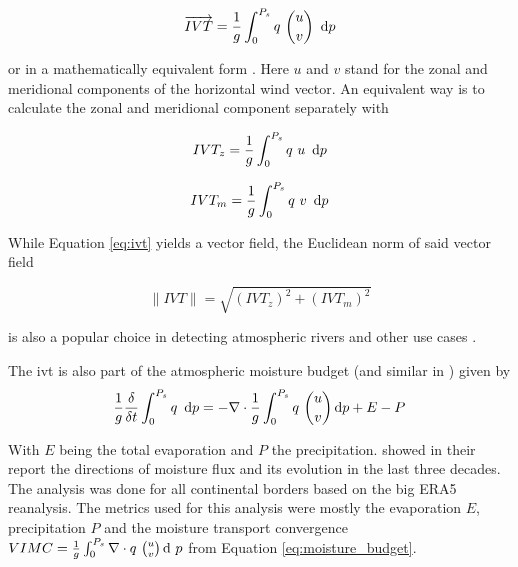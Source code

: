 \begin{equation}
\label{eq:ivt}  
\overrightarrow{IVT} = \frac{1}{g} \int^{P_s}_0 q ~\binom{u}{v} ~ \operatorname{d}\!{p}
\end{equation}

or in a mathematically equivalent form \cite{fernandez_analysis_2003}.
Here $u$ and $v$ stand for the zonal and meridional components of the horizontal wind vector. 
An equivalent way is to calculate the zonal and meridional component separately with 

\begin{equation}
\label{eq:zonal_ivt}
IVT_z = \frac{1}{g} \int^{P_s}_0 q ~u ~ \operatorname{d}\!{p}
\end{equation}


\begin{equation}
\label{eq:meridional_ivt}
IVT_m = \frac{1}{g} \int^{P_s}_0 q ~v ~ \operatorname{d}\!{p}
\end{equation}

While Equation \ref{eq:ivt} yields a vector field, the Euclidean norm of said vector field 

\begin{equation}
\label{eq:ivtnorm}
\lVert IVT \rVert = \sqrt{(IVT_z)^2 + (IVT_m)^2}  
\end{equation}

is also a popular choice in detecting atmospheric rivers \cite{sousa_north_2020, ramos_atmospheric_2016} and other use cases \cite{ayantobo_integrated_2022}.



The \ac{ivt} is also part of the atmospheric moisture budget \cite{yang_moisture_2022} (and similar in \cite{seager_mechanisms_2020}) given by 
\begin{equation}
\label{eq:moisture_budget}
\frac{1}{g} \frac{\delta}{\delta t} \int^{P_s}_0 q ~ \operatorname{d}\!{p} = - \nabla \cdot \frac{1}{g} \int^{P_s}_0 q ~\binom{u}{v} \operatorname{d}\!{p} + E - P
\end{equation}

With $E$ being the total evaporation and $P$ the precipitation. 
\citeauthor{yang_moisture_2022} showed in their report \cite{yang_moisture_2022} the directions of moisture flux and its evolution in the last three decades. The analysis was done for all continental borders based on the big ERA5 reanalysis.
The metrics used for this analysis were mostly the evaporation $E$, precipitation $P$ and the moisture transport convergence  $VIMC = \frac{1}{g} \int^{P_s}_0  \nabla \cdot q ~\binom{u}{v} \operatorname{d}\!{~} p$ from Equation \ref{eq:moisture_budget}.

